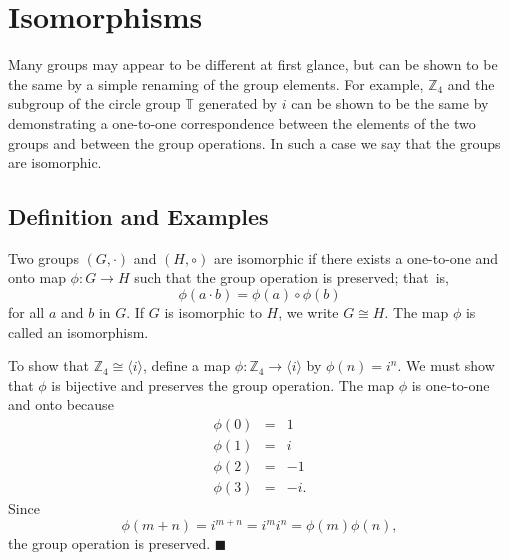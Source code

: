 \chapter{Isomorphisms}\label{isomorph}

Many groups may appear to be different at first glance, but can be shown to be the same by a simple renaming of the group elements.  For example, ${\mathbb Z}_4$ and  the subgroup of the circle group ${\mathbb T}$ generated by $i$ can be shown to be the same by demonstrating a one-to-one correspondence between the elements of the two groups and between the group operations. In such a case we say that the groups are isomorphic.  


\section{Definition and Examples}\label{isomorph_section_1}

Two groups $(G, \cdot)$ and $(H, \circ)$ are {\bfi isomorphic\/} if there exists a one-to-one and onto map $\phi : G \rightarrow H$ such that the group operation is preserved;  that~is, 
$$
\phi( a \cdot b) = \phi( a) \circ \phi( b)
$$
for all $a$ and $b$ in $G$. If $G$ is isomorphic to $H$, we write $G \cong H$\label{noteisomorph}. The map $\phi$ is called an {\bfi isomorphism}. 

\medskip

To show that ${\mathbb Z}_4 \cong \langle i \rangle$, define a map $\phi: {\mathbb Z}_4 \rightarrow \langle i \rangle$ by $\phi(n) = i^n$.  We must show that $\phi$ is bijective and preserves the group operation.  The map $\phi$ is one-to-one and onto because
\begin{eqnarray*}
\phi(0) & = & 1 \\
\phi(1) & = & i \\
\phi(2) & = & -1 \\
\phi(3) & = & -i.
\end{eqnarray*}
Since
$$
\phi(m + n) = i^{m+n} = i^m i^n = \phi(m) \phi( n),
$$
the group operation is preserved.
\hspace{\fill} $\blacksquare$

\medskip

